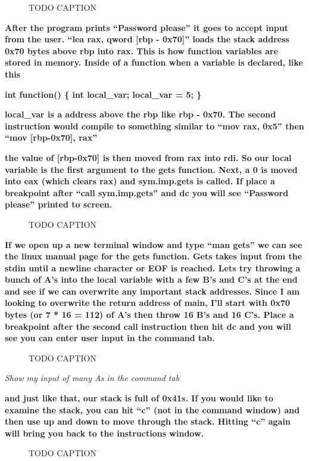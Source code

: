 \documentclass[letterpaper]{article}
\newcommand{\sitfig}[3]{
\begin{figure}[H]
\centering
\makebox[\textwidth][c]{
#2
}
\caption{#3}
\label{#1}
\end{figure}
}
\newcommand{\sitgfx}[4][scale=1.0]{
\sitfig{#3}{\texttt{[image: \#2]}}{#4}
}
\begin{document}
  
\sitgfx[width=5.8335in,height=3.6457in]{FINALWORKINGDOCFORMERLYPRECURSOR-img090.png}{fig:unk}{TODO CAPTION}
 

\textbf{After the program prints ``Password please'' it goes to accept input from the user. ``lea rax, qword [rbp -
0x70]'' loads the stack address 0x70 bytes above rbp into rax. This is how function variables are stored in memory.
Inside of a function when a variable is declared, like this}

\textbf{int function() \{ int local\_var; local\_var = 5; \}}

\textbf{local\_var is a address above the rbp like rbp - 0x70. The second instruction would compile to something similar
to ``mov rax, 0x5'' then ``mov [rbp-0x70], rax''}

\textbf{the value of [rbp-0x70] is then moved from rax into rdi. So our local variable is the first argument to the gets
function. Next, a 0 is moved into eax (which clears rax) and sym.imp.gets is called. If place a breakpoint after ``call
sym.imp.gets'' and dc you will see ``Password please'' printed to screen.}

  
\sitgfx[width=5.8335in,height=2.9654in]{FINALWORKINGDOCFORMERLYPRECURSOR-img091.png}{fig:unk}{TODO CAPTION}
 

\textbf{If we open up a new terminal window and type ``man gets'' we can see the linux manual page for the gets
function. Gets takes input from the stdin until a newline character or EOF is reached. Lets try throwing a bunch of A's
into the local variable with a few B's and C's at the end and see if we can overwrite any important stack addresses.
Since I am looking to overwrite the return address of main, I'll start with 0x70 bytes (or 7 * 16 = 112) of A's then
throw 16 B's and 16 C's. Place a breakpoint after the second call instruction then hit dc and you will see you can
enter user input in the command tab.}

  
\sitgfx[width=5.8335in,height=3.6457in]{FINALWORKINGDOCFORMERLYPRECURSOR-img092.png}{fig:unk}{TODO CAPTION}
 

\textit{Show my input of many As in the command tab}

\textbf{and just like that, our stack is full of 0x41s. If you would like to examine the stack, you can hit ``c'' (not
in the command window) and then use up and down to move through the stack. Hitting ``c'' again will bring you back to
the instructions window.}

  
\sitgfx[width=5.8335in,height=3.6457in]{FINALWORKINGDOCFORMERLYPRECURSOR-img093.png}{fig:unk}{TODO CAPTION}
 
\end{document}
